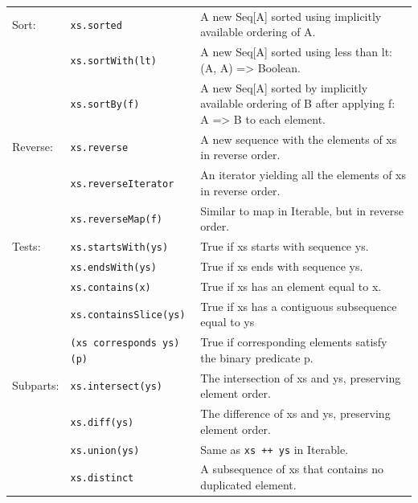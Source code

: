 \documentclass[article, a5paper]{memoir}
\begin{document}
{\begin{tabular}{@{}l p{3.75cm} p{6.8cm}}
  Sort: & \texttt{xs.sorted} & A new Seq[A] sorted using implicitly available ordering of A. \\   \cline{2-3}
   & \texttt{xs.sortWith(lt)} &  	A new Seq[A] sorted using less than lt: (A, A) => Boolean.\\\cline{2-3}
   & \texttt{xs.sortBy(f)}   &  	A new Seq[A] sorted by implicitly available ordering of B after applying f: A => B to each element.\\ \cline{1-3}


Reverse: & \texttt{xs.reverse} & A new sequence with the elements of xs in reverse order. \\   \cline{2-3}
   & \texttt{xs.reverseIterator} & An iterator yielding all the elements of xs in reverse order.\\\cline{2-3}
   & \texttt{xs.reverseMap(f)} & Similar to map in Iterable, but in reverse order.\\\cline{1-3}


  Tests: & \texttt{xs.startsWith(ys)} & True if xs starts with sequence ys. \\   \cline{2-3}
   & \texttt{xs.endsWith(ys)} & True if xs ends with sequence ys.\\\cline{2-3}
   & \texttt{xs.contains(x)} & True if xs has an element equal to x.\\\cline{2-3}
   & \texttt{xs.containsSlice(ys)} & True if xs has a contiguous subsequence equal to ys\\\cline{2-3}
   & \texttt{(xs corresponds ys)(p)} & True if corresponding elements satisfy the binary predicate p.\\\cline{1-3}

  Subparts: & \texttt{xs.intersect(ys)} & The intersection of xs and ys, preserving element order.\\\cline{2-3}
   & \texttt{xs.diff(ys)} & The difference of xs and ys, preserving element order.\\\cline{2-3}
   & \texttt{xs.union(ys)} & Same as \texttt{xs ++ ys} in Iterable.\\\cline{2-3}
   & \texttt{xs.distinct} & A subsequence of xs that contains no duplicated element.\\\cline{1-3}



\end{tabular}
}
\end{document}
